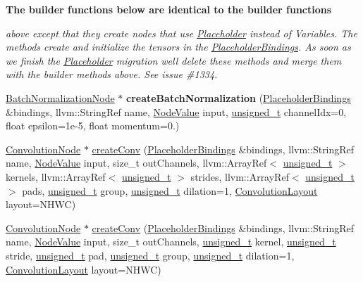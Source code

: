 \begin{Indent}\textbf{ The builder functions below are identical to the builder functions}\par
{\em above except that they create nodes that use \hyperlink{classglow_1_1_placeholder}{Placeholder} instead of Variables. The methods create and initialize the tensors in the \hyperlink{classglow_1_1_placeholder_bindings}{Placeholder\+Bindings}. As soon as we finish the \hyperlink{classglow_1_1_placeholder}{Placeholder} migration we\textquotesingle{}ll delete these methods and merge them with the builder methods above. See issue \#1334. }\begin{DoxyCompactItemize}
\item 
\mbox{\label{classglow_1_1_function_a7ecd6f8406787c42d7fe75370acae397}} 
\hyperlink{classglow_1_1_batch_normalization_node}{Batch\+Normalization\+Node} $\ast$ {\bfseries create\+Batch\+Normalization} (\hyperlink{classglow_1_1_placeholder_bindings}{Placeholder\+Bindings} \&bindings, llvm\+::\+String\+Ref name, \hyperlink{structglow_1_1_node_value}{Node\+Value} input, \hyperlink{namespaceglow_a0ca574644e1e42ef193a9947fb4d8911}{unsigned\+\_\+t} channel\+Idx=0, float epsilon=1e-\/5, float momentum=0.)
\item 
\hyperlink{classglow_1_1_convolution_node}{Convolution\+Node} $\ast$ \hyperlink{classglow_1_1_function_a878cada26ba13b88d149d7a631f5ae10}{create\+Conv} (\hyperlink{classglow_1_1_placeholder_bindings}{Placeholder\+Bindings} \&bindings, llvm\+::\+String\+Ref name, \hyperlink{structglow_1_1_node_value}{Node\+Value} input, size\+\_\+t out\+Channels, llvm\+::\+Array\+Ref$<$ \hyperlink{namespaceglow_a0ca574644e1e42ef193a9947fb4d8911}{unsigned\+\_\+t} $>$ kernels, llvm\+::\+Array\+Ref$<$ \hyperlink{namespaceglow_a0ca574644e1e42ef193a9947fb4d8911}{unsigned\+\_\+t} $>$ strides, llvm\+::\+Array\+Ref$<$ \hyperlink{namespaceglow_a0ca574644e1e42ef193a9947fb4d8911}{unsigned\+\_\+t} $>$ pads, \hyperlink{namespaceglow_a0ca574644e1e42ef193a9947fb4d8911}{unsigned\+\_\+t} group, \hyperlink{namespaceglow_a0ca574644e1e42ef193a9947fb4d8911}{unsigned\+\_\+t} dilation=1, \hyperlink{namespaceglow_aa2f3a33e05699df0f42295c5c4bd1f77}{Convolution\+Layout} layout=N\+H\+WC)
\item 
\hyperlink{classglow_1_1_convolution_node}{Convolution\+Node} $\ast$ \hyperlink{classglow_1_1_function_a9fce0de99a46d774b0f9bd9aa04b1498}{create\+Conv} (\hyperlink{classglow_1_1_placeholder_bindings}{Placeholder\+Bindings} \&bindings, llvm\+::\+String\+Ref name, \hyperlink{structglow_1_1_node_value}{Node\+Value} input, size\+\_\+t out\+Channels, \hyperlink{namespaceglow_a0ca574644e1e42ef193a9947fb4d8911}{unsigned\+\_\+t} kernel, \hyperlink{namespaceglow_a0ca574644e1e42ef193a9947fb4d8911}{unsigned\+\_\+t} stride, \hyperlink{namespaceglow_a0ca574644e1e42ef193a9947fb4d8911}{unsigned\+\_\+t} pad, \hyperlink{namespaceglow_a0ca574644e1e42ef193a9947fb4d8911}{unsigned\+\_\+t} group, \hyperlink{namespaceglow_a0ca574644e1e42ef193a9947fb4d8911}{unsigned\+\_\+t} dilation=1, \hyperlink{namespaceglow_aa2f3a33e05699df0f42295c5c4bd1f77}{Convolution\+Layout} layout=N\+H\+WC)

\end{DoxyCompactItemize}
\end{Indent}
